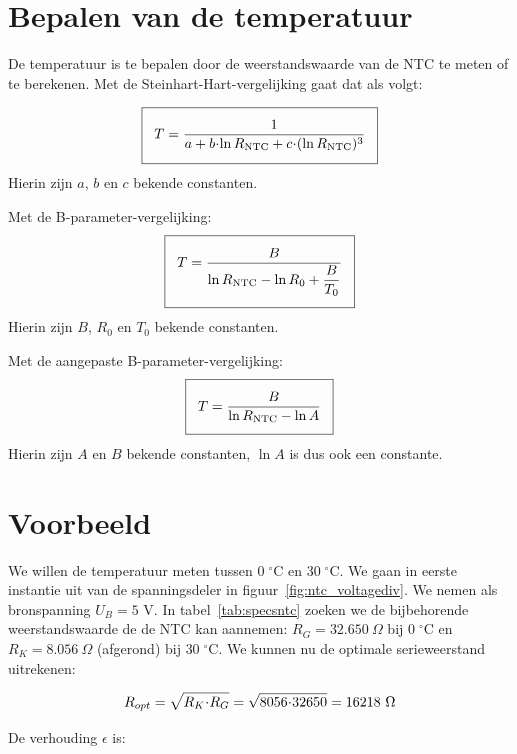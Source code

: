 \documentclass[12pt,a4paper,final,twoside,fleqn]{article}
\newcommand{\mathcelc}[1]{\mbox{$#1\;^\circ\text{C}$}}
\newcommand{\rntc}{R_\text{NTC}}
\newcommand{\ropt}{R_{opt}}
\let\oldcdot\cdot
\renewcommand{\cdot}{\kern-.10em\oldcdot\kern-.10em}
\begin{document}
\clearpage
\section{Bepalen van de temperatuur}
De temperatuur is te bepalen door de weerstandswaarde van de NTC te meten of te
berekenen.
Met de Steinhart-Hart-vergelijking gaat dat als volgt:

\begin{equation}
\label{equ:invertedsteinharthart}
\setlength\fboxsep{2ex}
\boxed{T = \dfrac{1}{a + b\cdot\ln \rntc + c\cdot( \ln \rntc )^3}}
\end{equation}
Hierin zijn $a$, $b$ en $c$ bekende constanten.

Met de B-parameter-vergelijking:
\begin{equation}
\label{equ:invertedsteinharthartsimpl}
\setlength\fboxsep{2ex}
\boxed{T = \dfrac{B}{\ln \rntc - \ln R_0 + \dfrac{B}{T_0}}}
\end{equation}
Hierin zijn $B$, $R_0$ en $T_0$ bekende constanten.


Met de aangepaste B-parameter-vergelijking:
\begin{equation}
\label{equ:invertedsteinharthartadapt}
\setlength\fboxsep{2ex}
\boxed{T = \dfrac{B}{\ln \rntc - \ln A}}
\end{equation}
Hierin zijn $A$ en $B$ bekende constanten, $\ln A$ is dus ook een constante.



\clearpage
\section{Voorbeeld}
\label{sec:voorbeeld}
We willen de temperatuur meten tussen \mathcelc{0} en \mathcelc{30}. We gaan in
eerste instantie uit van de spanningsdeler in figuur~\ref{fig:ntc_voltagediv}.
We nemen als bronspanning $U_B=5$ V. In
tabel~\ref{tab:specsntc} zoeken we de bijbehorende weerstandswaarde de de NTC
kan aannemen: $R_G=32.650\ \Omega$ bij \mathcelc{0} en $R_K= 8.056\ \Omega$
(afgerond) bij \mathcelc{30}. We kunnen nu de optimale serieweerstand uitrekenen:

\begin{equation}
\ropt = \sqrt{R_K\cdot R_G} = \sqrt{8056\cdot32650} = 16218\ \Omega
\end{equation}

De verhouding $\epsilon$ is: 
\end{document}

